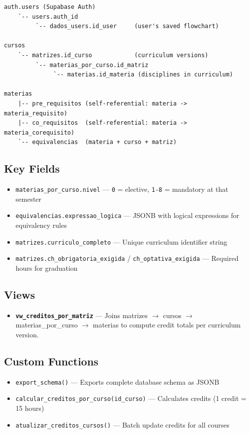 \documentclass[11pt,a4paper]{article}
\newcommand{\code}[1]{\texttt{#1}}
\begin{document}
\begin{lstlisting}
auth.users (Supabase Auth)
    `-- users.auth_id
         `-- dados_users.id_user     (user's saved flowchart)

cursos
    `-- matrizes.id_curso            (curriculum versions)
         `-- materias_por_curso.id_matriz
              `-- materias.id_materia (disciplines in curriculum)

materias
    |-- pre_requisitos (self-referential: materia -> materia_requisito)
    |-- co_requisitos  (self-referential: materia -> materia_corequisito)
    `-- equivalencias  (materia + curso + matriz)
\end{lstlisting}

\subsection{Key Fields}
\begin{itemize}[noitemsep]
    \item \code{materias\_por\_curso.nivel} — \code{0} = elective, \code{1-8} = mandatory at that semester
    \item \code{equivalencias.expressao\_logica} — JSONB with logical expressions for equivalency rules
    \item \code{matrizes.curriculo\_completo} — Unique curriculum identifier string
    \item \code{matrizes.ch\_obrigatoria\_exigida} / \code{ch\_optativa\_exigida} — Required hours for graduation
\end{itemize}

\subsection{Views}
\begin{itemize}[noitemsep]
    \item \textbf{\code{vw\_creditos\_por\_matriz}} — Joins matrizes $\to$ cursos $\to$
    materias\_por\_curso $\to$ materias to compute credit totals per curriculum version.
\end{itemize}

\subsection{Custom Functions}
\begin{itemize}[noitemsep]
    \item \code{export\_schema()} — Exports complete database schema as JSONB
    \item \code{calcular\_creditos\_por\_curso(id\_curso)} — Calculates credits (1 credit = 15 hours)
    \item \code{atualizar\_creditos\_cursos()} — Batch update credits for all courses
\end{itemize}
\end{document}
